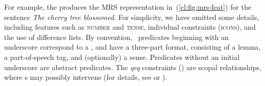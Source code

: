 \documentclass[output=paper
 	        ,biblatex
                ,babelshorthands
                ,newtxmath
                ,draftmode
                ,colorlinks, citecolor=brown
]{langscibook}
\begin{document}
\largerpage
For example, the 
produces the MRS representation in~(\ref{cl:fig:mrs-feat})
for the sentence \emph{The cherry tree blossomed}.
For simplicity, we have omitted some details, including
features such as \textsc{number} and \textsc{tense},
individual constraints (\textsc{icons}),
and the use of difference lists.
By convention, \delphin\ predicates beginning with an
underscore correspond to a , and have a three-part format,
consisting of a lemma, a part-of-speech tag, and (optionally) a sense.
Predicates without an initial underscore are abstract predicates.
The \textit{qeq} constraints ()
are scopal relationships, where s may possibly intervene
(for details, see \citealt{CFPS2005a} or ).

\begin{exe}
	\ex\label{cl:fig:mrs-feat}
\end{exe}
\end{document}
